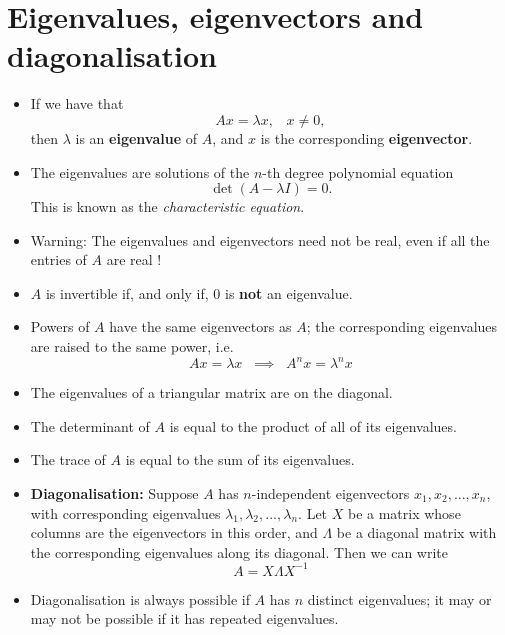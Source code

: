 \documentclass[11pt]{article}
\begin{document}
\section{Eigenvalues, eigenvectors and diagonalisation}
\begin{itemize}
\item If we have that
$$Ax = \lambda x, \;\;\; x \neq 0,$$
then $\lambda$ is an \textbf{eigenvalue} of $A$, and $x$ is the corresponding \textbf{eigenvector}. 
\item The eigenvalues are solutions of the $n$-th degree polynomial equation
$$\det (A-\lambda I) = 0.$$
This is known as the \emph{characteristic equation}.
\item Warning: The eigenvalues and eigenvectors need not be real, even if all the entries of $A$ are real !
\item $A$ is invertible if, and only if, $0$ is \textbf{not} an eigenvalue.
\item Powers of $A$ have the same eigenvectors as $A$; the corresponding eigenvalues are raised to the same power, i.e.
$$ Ax = \lambda x \;\; \implies \;\; A^n x = \lambda^n x$$
\item The eigenvalues of a triangular matrix are on the diagonal.
\item The determinant of $A$ is equal to the product of all of its eigenvalues. 
\item The trace of $A$ is equal to the sum of its eigenvalues. 
\item \textbf{Diagonalisation:} Suppose $A$ has $n$-independent eigenvectors $x_1, x_2,...,x_n$, with corresponding eigenvalues $\lambda_1, \lambda_2,...,\lambda_n$. Let $X$ be a matrix whose columns are the eigenvectors in this order, and $\Lambda$ be a diagonal matrix with the corresponding eigenvalues along its diagonal. Then we can write
$$\boxed{A=X\Lambda X^{-1}}$$
\item Diagonalisation is always possible if $A$ has $n$ distinct eigenvalues; it may or may not be possible if it has repeated eigenvalues.
\end{itemize}
\end{document}
